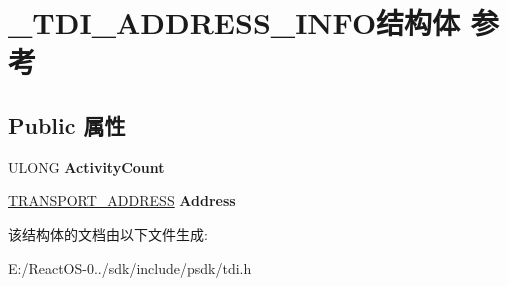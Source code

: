 \hypertarget{struct___t_d_i___a_d_d_r_e_s_s___i_n_f_o}{}\section{\+\_\+\+T\+D\+I\+\_\+\+A\+D\+D\+R\+E\+S\+S\+\_\+\+I\+N\+F\+O结构体 参考}
\label{struct___t_d_i___a_d_d_r_e_s_s___i_n_f_o}
\subsection*{Public 属性}
\begin{DoxyCompactItemize}
\item 
\mbox{\label{struct___t_d_i___a_d_d_r_e_s_s___i_n_f_o_aa3b80d71088fe318d2c2032769cdddeb}} 
U\+L\+O\+NG {\bfseries Activity\+Count}
\item 
\mbox{\label{struct___t_d_i___a_d_d_r_e_s_s___i_n_f_o_a4562f42076ada61c245d020b6cd395d2}} 
\hyperlink{struct___t_r_a_n_s_p_o_r_t___a_d_d_r_e_s_s}{T\+R\+A\+N\+S\+P\+O\+R\+T\+\_\+\+A\+D\+D\+R\+E\+SS} {\bfseries Address}
\end{DoxyCompactItemize}


该结构体的文档由以下文件生成\+:\begin{DoxyCompactItemize}
\item 
E\+:/\+React\+O\+S-\/0../sdk/include/psdk/tdi.\+h\end{DoxyCompactItemize}
